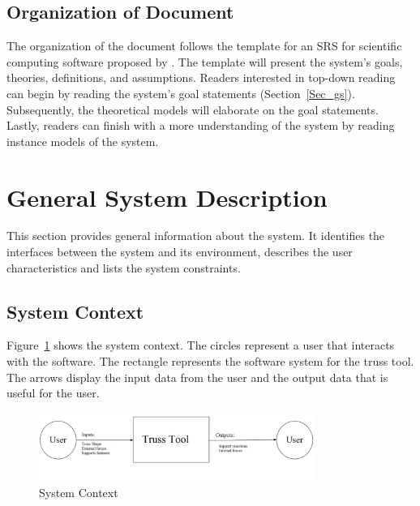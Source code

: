 \documentclass[12pt]{article}
\begin{document}
\subsection{Organization of Document}
The organization of the document follows the template for an SRS for scientific computing software proposed by \citet{SmithandLai2005}. The template will present the system's goals, theories, definitions, and assumptions. Readers interested in top-down reading can begin by reading the system's goal statements (Section~\ref{Sec_gs}). Subsequently, the theoretical models will elaborate on the goal statements. Lastly, readers can finish with a more  understanding of the system by reading instance models of the system.

\section{General System Description}

This section provides general information about the system.  It identifies the interfaces between the system and its environment, describes the user characteristics and lists the system constraints. 

\subsection{System Context}
Figure~\ref{Fig_SystemContext} shows the system context. The circles 
represent a user that interacts with the software. The rectangle represents the software system for the truss tool. The arrows display the input data from the user and the output data that is useful for the user.

\begin{figure}[h!]
\begin{center}
 \includegraphics[width=0.8\textwidth]{systemcontext .jpg}
\caption{System Context}
\label{Fig_SystemContext} 
\end{center}
\end{figure}
\end{document}
